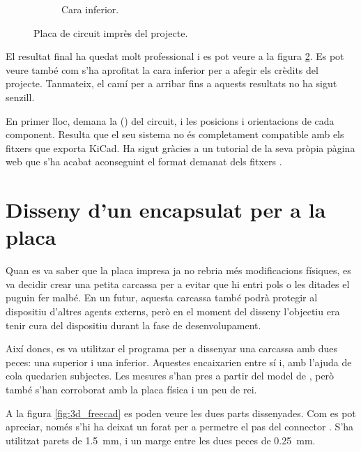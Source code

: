 \begin{figure}[ht]
\begin{subfigure}{0.45\textwidth}
        \caption{Cara inferior.}
        \label{fig:printedpcb_bottom}
    \end{subfigure}
    \caption{Placa de circuit imprès del projecte.}
    \label{fig:printedpcb}
\end{figure}

El resultat final ha quedat molt professional i es pot veure a la figura
\ref{fig:printedpcb}. Es pot veure també com s'ha aprofitat la cara inferior
per a afegir els crèdits del projecte. Tanmateix, el camí per a arribar fins
a aquests resultats no ha sigut senzill.

En primer lloc,  demana la  ()
del circuit, i les posicions i orientacions de cada component. Resulta que el
seu sistema no és completament compatible amb els fitxers que exporta
KiCad. Ha sigut gràcies a un tutorial de la seva pròpia pàgina web que s'ha
acabat aconseguint el format demanat dels fitxers \cite{KiCADJLC}.

\section{Disseny d'un encapsulat per a la placa}

Quan es va saber que la placa impresa ja no rebria més modificacions físiques,
es va decidir crear una petita carcassa per a evitar que hi entri pols o les
ditades el puguin fer malbé. En un futur, aquesta carcassa també podrà protegir
al dispositiu d'altres agents externs, però en el moment del disseny l'objectiu
era tenir cura del dispositiu durant la fase de desenvolupament.

Així doncs, es va utilitzar el programa  per a dissenyar una
carcassa amb dues peces: una superior i una inferior. Aquestes encaixarien entre
sí i, amb l'ajuda de cola quedarien subjectes. Les mesures s'han pres a partir
del model de , però també s'han corroborat amb la placa física i un
peu de rei.

A la figura \ref{fig:3d_freecad} es poden veure les dues parts dissenyades. Com es pot
apreciar, només s'hi ha deixat un forat per a permetre el pas del connector
. S'ha utilitzat parets de \SI{1.5}{\milli\meter}, i un marge entre
les dues peces de \SI{0.25}{\milli\meter}.

